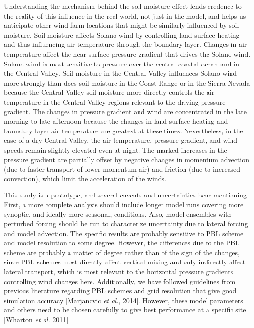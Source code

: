 Understanding the mechanism behind the soil moisture effect lends credence to the reality of this influence in the real world, not just in the model, and helps us anticipate other wind farm locations that might be similarly influenced by soil moisture.  Soil moisture affects Solano wind by controlling land surface heating and thus influencing air temperature through the boundary layer.  Changes in air temperature affect the near-surface pressure gradient that drives the Solano wind.  Solano wind is most sensitive to pressure over the central coastal ocean and in the Central Valley.  Soil moisture in the Central Valley influences Solano wind more strongly than does soil moisture in the Coast Range or in the Sierra Nevada because the Central Valley soil moisture more directly controls the air temperature in the Central Valley regions relevant to the driving pressure gradient.  The changes in pressure gradient and wind are concentrated in the late morning to late afternoon because the changes in land-surface heating and boundary layer air temperature are greatest at these times.  Nevertheless, in the case of a dry Central Valley, the air temperature, pressure gradient, and wind speeds remain slightly elevated even at night.  The marked increases in the pressure gradient are partially offset by negative changes in momentum advection (due to faster transport of lower-momentum air) and friction (due to increased convection), which limit the acceleration of the winds.

This study is a prototype, and several caveats and uncertainties bear mentioning.  First, a more complete analysis should include longer model runs covering more synoptic, and ideally more seasonal, conditions.  Also, model ensembles with perturbed forcing should be run to characterize uncertainty due to lateral forcing and model advection.  The specific results are probably sensitive to PBL scheme and model resolution to some degree.  However, the differences due to the PBL scheme are probably a matter of degree rather than of the sign of the changes, since PBL schemes most directly affect vertical mixing and only indirectly affect lateral transport, which is most relevant to the horizontal pressure gradients controlling wind changes here.  Additionally, we have followed guidelines from previous literature regarding PBL schemes and grid resolution that give good simulation accuracy [Marjanovic \textit{et al.}, 2014].  However, these model parameters and others need to be chosen carefully to give best performance at a specific site [Wharton \textit{et al.} 2011].

